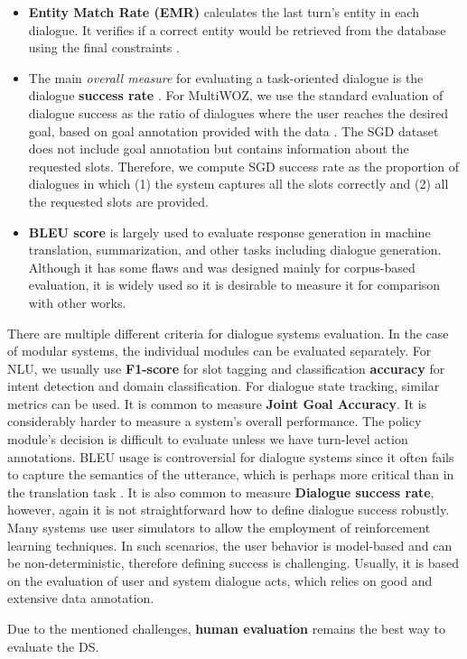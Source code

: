 \begin{itemize}
    \item \textbf{Entity Match Rate (EMR)} calculates the last turn's entity in each dialogue. It verifies if a correct entity would be retrieved from the database using the final constraints \cite{wen2016network}.
    \item The main \emph{overall measure} for evaluating a task-oriented dialogue is the dialogue \textbf{success rate} \cite{deriu_survey_2021}.
For MultiWOZ, we use the standard evaluation of dialogue success as the ratio of dialogues where the user reaches the desired goal, based on goal annotation provided with the data \cite{nekvinda-dusek-2021-shades}. 
The SGD dataset does not include goal annotation but contains information about the requested slots. Therefore, we compute SGD success rate as the proportion of dialogues in which (1) the system captures all the slots correctly and (2) all the requested slots are provided.
    \item  \textbf{BLEU score} \cite{papineni-etal-2002-bleu} is largely used to evaluate response generation in machine translation, summarization, and other tasks including dialogue generation.
    Although it has some flaws \cite{callison-burch-etal-2006-evaluating} and was designed mainly for corpus-based evaluation, it is widely used so it is desirable to measure it for comparison with other works.
\end{itemize}

There are multiple different criteria for dialogue systems evaluation.
In the case of modular systems, the individual modules can be evaluated separately.
For NLU, we usually use \textbf{F1-score} for slot tagging and classification \textbf{accuracy} for intent detection and domain classification.
For dialogue state tracking, similar metrics can be used.
It is common to measure \textbf{Joint Goal Accuracy}.
It is considerably harder to measure a system's overall performance.
The policy module's decision is difficult to evaluate unless we have turn-level action annotations.
BLEU usage is controversial for dialogue systems since it often fails to capture the semantics of the utterance, which is perhaps more critical than in the translation task \cite{lowe2017towards}.
It is also common to measure \textbf{Dialogue success rate}, however, again it is not straightforward how to define dialogue success robustly.
Many systems use user simulators to allow the employment of reinforcement learning techniques.
In such scenarios, the user behavior is model-based and can be non-deterministic, therefore defining success is challenging.
Usually, it is based on the evaluation of user and system dialogue acts, which relies on good and extensive data annotation.

Due to the mentioned challenges, \textbf{human evaluation} remains the best way to evaluate the DS.
